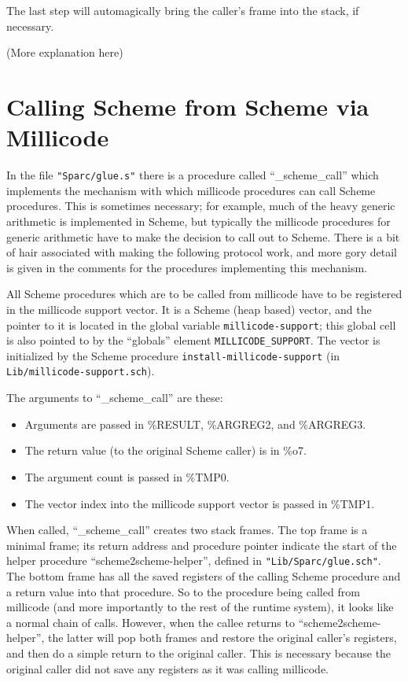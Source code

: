 The last step will automagically bring the caller's frame into the
stack, if necessary.

(More explanation here)

\section{Calling Scheme from Scheme via Millicode}

In the file \verb+"Sparc/glue.s"+ there is a procedure called 
``\_scheme\_call'' which implements the mechanism with which millicode 
procedures can call Scheme procedures. This is sometimes necessary; for
example, much of the heavy generic arithmetic is implemented in Scheme, 
but typically the millicode procedures for generic arithmetic have to
make the decision to call out to Scheme. There is a bit of hair
associated with making the following protocol work, and more gory
detail is given in the comments for the procedures implementing this
mechanism.

All Scheme procedures which are to be called from millicode have to be
registered in the millicode support vector.  It is a Scheme (heap
based) vector, and the pointer to it is located in the global variable
\verb+millicode-support+; this global cell is also pointed to by the 
``globals'' element \verb+MILLICODE_SUPPORT+. The vector is
initialized by the Scheme procedure \verb+install-millicode-support+
(in \verb+Lib/millicode-support.sch+). 

The arguments to ``\_scheme\_call'' are these:

\begin{itemize}
\parskip 0in
\item Arguments are passed in \%RESULT, \%ARGREG2, and \%ARGREG3.
\item The return value (to the original Scheme caller) is in \%o7.
\item The argument count is passed in \%TMP0.
\item The vector index into the millicode support vector is passed in \%TMP1.
\end{itemize}

When called, ``\_scheme\_call'' creates two stack frames. The top frame is
a minimal frame; its return address and procedure pointer indicate the start
of the helper procedure ``scheme2scheme-helper'', defined in 
\verb+"Lib/Sparc/glue.sch"+. The bottom frame has all the saved registers
of the calling Scheme procedure and a return value into that procedure.
So to the procedure being called from millicode (and more importantly to
the rest of the runtime system), it looks like a normal chain of calls.
However, when the callee returns to ``scheme2scheme-helper'', the latter will
pop both frames and restore the original caller's registers, and then do a
simple return to the original caller. This is necessary because the original
caller did not save any registers as it was calling millicode.


